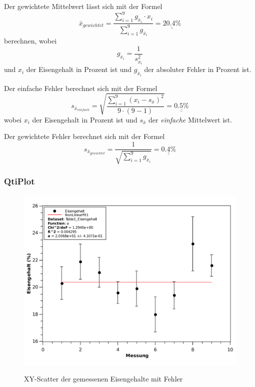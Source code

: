 Der gewichtete Mittelwert l\"asst sich mit der Formel
\[ \bar{x}_{gewichtet} = \frac{ \sum_{i=1}^{9} g_{\bar{x}_i} \cdot x_i}{ \sum_{i=1}^{9} g_{\bar{x}_i}} = \underline{\underline{20.4 \textrm{\%}}} \]
berechnen, wobei
\[ g_{\bar{x}_i} = \frac{1}{s_{\bar{x}_i}^2} \]
und $x_i$ der Eisengehalt in Prozent ist und $g_{\bar{x}_i}$ der absoluter Fehler in Prozent ist.

Der einfache Fehler berechnet sich mit der Formel
\[ s_{\bar{x}_{einfach}} = \sqrt{ \frac{ \sum_{i=1}^{9} (x_i - s_{\bar{x}})^2}{ 9 \cdot (9-1) }} = \underline{\underline{0.5 \textrm{\%}}} \]
wobei $x_i$ der Eisengehalt in Prozent ist und $s_{\bar{x}}$ der \emph{einfache} Mittelwert ist.

Der gewichtete Fehler berechnet sich mit der Formel
\[ s_{\bar{x}_{gewichtet}} = \frac{1}{ \sqrt{ \sum_{i=1}^{9} g_{\bar{x}_i} } } = \underline{\underline{0.4 \textrm{\%}}}  \]


\subsubsection*{QtiPlot}

\begin{figure}[h!]
    \caption{XY-Scatter der gemessenen Eisengehalte mit Fehler}
    \includegraphics[width=\textwidth]{qtiplot/eisengehalt}
    \label{fig:eisengehalt}
\end{figure}

